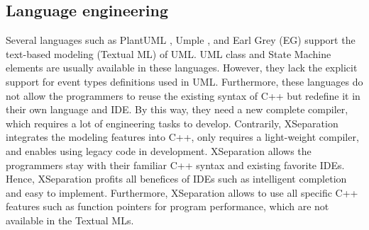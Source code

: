 \subsection{Language engineering}
Several languages such as PlantUML \cite{plantuml}, Umple \cite{lethbridge2010umplification}, and Earl Grey (EG) \cite{mazanec2012general} support the text-based modeling (Textual ML) of UML.  
UML class and State Machine elements are usually available in these languages.
However, they lack the explicit support for event types definitions used in UML.
Furthermore, these languages 
do not allow the programmers to reuse the existing syntax of C++ but redefine it in their own language and IDE. 
By this way, they need a new complete compiler, which requires a lot of engineering tasks to develop. 
Contrarily, XSeparation integrates the modeling features into C++, only requires a light-weight compiler, and enables using legacy code in development.
XSeparation allows the programmers stay with their familiar C++ syntax and existing favorite IDEs. %
Hence, XSeparation profits all benefices of IDEs such as intelligent completion and easy to implement. 
Furthermore, XSeparation allows to use all specific C++ features such as function pointers for program performance, which are not available in the Textual MLs.

\begin{comment}
\begin{itemize}[\footnotesize]
	\item RAOES adapts USM features to existing programming languages while Umple or TextUML does inversely, hence RAOES profits all benefices of IDEs such as intelligent completion and easy to implement. Furthermore, RAOES allows to use all specific C++ features such as function pointers for program efficiency, which are not available in the the TMLs.
	
	\item In RAOES, the programmers write and maintain the USM-based behavior part in the same class/file containing the active class.
	
	\item RAOES support full USM features.
	
	\item RAOES automatically synchronizes the code with the system model specified by UML.
	
	\item RAOES defines the state machine topology separately from the transition table and event definition.
\end{itemize}
\end{comment}


